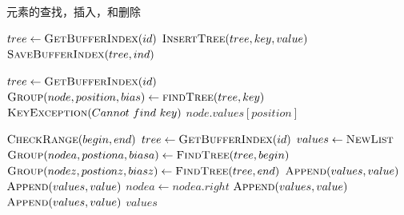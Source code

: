 \documentclass[UTF8]{ctexrep} %
\begin{document}
\begin{algorithm}
    \caption{元素的查找，插入，和删除}
    \label{alg:operation_element}
    \begin{algorithmic}
            \State $tree \leftarrow \Call{GetBufferIndex}{id}$
            \State $\Call{InsertTree}{tree, key, value}$
            \State $\Call{SaveBufferIndex}{tree, ind}$ 
        \EndFunction
        
            \State $tree \leftarrow \Call{GetBufferIndex}{id}$
            \State $\Call{Group}{node, position, bias} \leftarrow \Call{findTree}{tree, key}$
                \State \Raise $\Call{KeyException}{Cannot\ find\ key}$
            \Else
                \State \Return $node.values[position]$
            \EndIf
        \EndFunction
        
            \State $\Call{CheckRange}{begin, end}$ 
            \State $tree \leftarrow \Call{GetBufferIndex}{id}$
            \State $values \leftarrow \Call{NewList}{}$
            \State $\Call{Group}{nodea, postiona, biasa} \leftarrow \Call{FindTree}{tree, begin}$
            \State $\Call{Group}{nodez, postionz, biasz} \leftarrow \Call{FindTree}{tree, end}$
             
                    \State $\Call{Append}{values, value}$
                \EndFor
            \Else
                    \State $\Call{Append}{values, value}$
                \EndFor
                    \State $nodea \leftarrow nodea.right$
                            \State $\Call{Append}{values, value}$
                        \EndFor
                \EndWhile
                    \State $\Call{Append}{values, value}$
                \EndFor
            \EndIf
            \State \Return $values$
        \EndFunction
    \end{algorithmic}
\end{algorithm}
\end{document}
